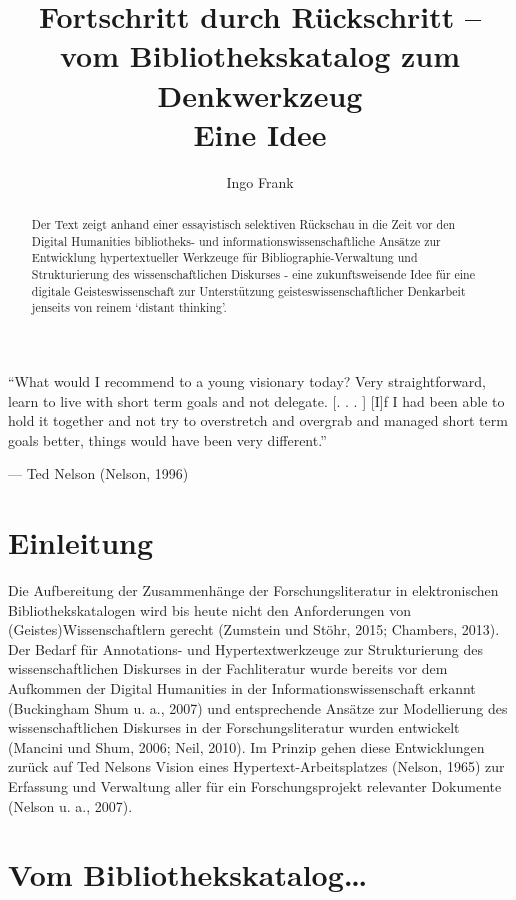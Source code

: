 \documentclass[a4paper,
fontsize=11pt,
oneside,
numbers=noperiodatend,
parskip=half-,
bibliography=totoc,
final
]{scrartcl}
\title{\LARGE{Fortschritt durch Rückschritt -- vom Bibliothekskatalog zum Denkwerkzeug \\ Eine Idee}} %
\author{Ingo Frank} %
\date{}
\begin{document}
\maketitle
\thispagestyle{fancyplain} 

\begin{abstract}
Der Text zeigt anhand einer essayistisch selektiven Rückschau in die
Zeit vor den Digital Humanities bibliotheks- und
informationswissenschaftliche Ansätze zur Entwicklung hypertextueller
Werkzeuge für Bibliographie-Verwaltung und Strukturierung des
wissenschaftlichen Diskurses - eine zukunftsweisende Idee für eine
digitale Geisteswissenschaft zur Unterstützung geisteswissenschaftlicher
Denkarbeit jenseits von reinem `distant thinking'.
\end{abstract}

\enquote{What would I recommend to a young visionary today? Very
straightforward, learn to live with short term goals and not delegate.
{[}. . . {]} {[}I{]}f I had been able to hold it together and not try to
overstretch and overgrab and managed short term goals better, things
would have been very different.}

--- Ted Nelson (Nelson, 1996)

\section*{Einleitung}\label{einleitung}

Die Aufbereitung der Zusammenhänge der Forschungsliteratur in
elektronischen Bibliothekskatalogen wird bis heute nicht den
Anforderungen von (Geistes)Wissenschaftlern gerecht (Zumstein und Stöhr,
2015; Chambers, 2013). Der Bedarf für Annotations- und
Hypertextwerkzeuge zur Strukturierung des wissenschaftlichen Diskurses
in der Fachliteratur wurde bereits vor dem Aufkommen der Digital
Humanities in der Informationswissenschaft erkannt (Buckingham Shum u.
a., 2007) und entsprechende Ansätze zur Modellierung des
wissenschaftlichen Diskurses in der Forschungsliteratur wurden
entwickelt (Mancini und Shum, 2006; Neil, 2010). Im Prinzip gehen diese
Entwicklungen zurück auf Ted Nelsons Vision eines
Hypertext-Arbeitsplatzes (Nelson, 1965) zur Erfassung und Verwaltung
aller für ein Forschungsprojekt relevanter Dokumente (Nelson u. a.,
2007).

\section*{Vom
Bibliothekskatalog\ldots{}}\label{vom-bibliothekskatalog}
\end{document}
